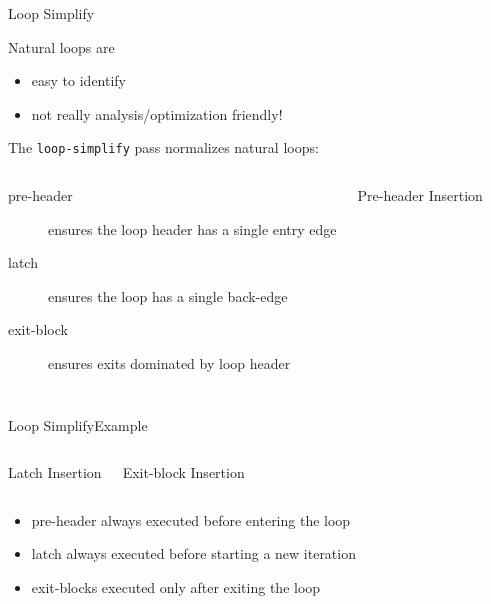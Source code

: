 \begin{frame}{Loop Simplify}

Natural loops are

\begin{itemize}
\item easy to \alert{identify}
\item not really analysis/optimization friendly!
\end{itemize}

\vfill
The \texttt{loop-simplify} pass normalizes natural loops:

\begin{columns}[t]
\begin{description}
\item[pre-header] ensures the \alert{loop header} has \alert{a single entry edge}
\item[latch] ensures the loop has \alert{a single back-edge}
\item[exit-block] ensures \alert{exits dominated} by loop \alert{header}
\end{description}

\vspace{-1em}
\begin{block}{Pre-header Insertion}
\centering

\end{block}
\end{columns}
\end{frame}


\begin{frame}{Loop Simplify}{Example}
\vspace{-1.5em}
\begin{columns}[t]
\begin{block}{Latch Insertion}
\centering

\end{block}

\begin{block}{Exit-block Insertion}
\centering

\end{block}
\end{columns}
\bigskip
\begin{itemize}
\item pre-header always executed before entering the loop
\item latch always executed before starting a new iteration
\item exit-blocks executed only after exiting the loop
\end{itemize}
\end{frame}


